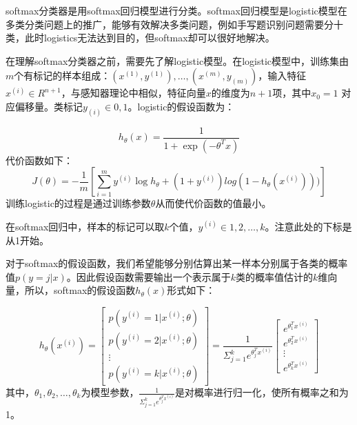 \documentclass[bachelor,zhspacing]{cqu}  %
\begin{document}
softmax分类器是用softmax回归模型进行分类。softmax回归模型是logistic模型在多类分类问题上的推广，能够有效解决多类问题，例如手写题识别问题需要分十类，此时logistics无法达到目的，但softmax却可以很好地解决。

在理解softmax分类器之前，需要先了解logistic模型。在logistic模型中，训练集由\(m\)个有标记的样本组成：\({(x^{(1)},y^{(1)}),\ldots,(x^{(m)},y_{(m)})}\)，输入特征\(x^{(i)} \in R^{n+1}\)，与感知器理论中相似，特征向量\(x\)的维度为\(n+1\)项，其中\(x_{0} = 1\)
对应偏移量。类标记\(y_{(i)}\in{0,1}\)。logistic的假设函数为：

\[h_{\theta}(x)=\frac{1}{1+\exp(-\theta^{T}x)}\] 代价函数如下：
\begin{equation}J(\theta) = - \frac{1}{m}[\sum_{i=1}^{m}y^{(i)}\log h_{\theta}+(1+y^{(i)})log(1-h_{\theta}(x^{(i)})))]\label{eq:logistic-cost}\end{equation}
训练logistic的过程是通过训练参数\(\theta\)从而使代价函数的值最小。

在softmax回归中，样本的标记可以取\(k\)个值，\(y^{(i)}\in {1,2,\ldots,k}\)。注意此处的下标是从1开始。

对于softmax的假设函数，我们希望能够分别估算出某一样本分别属于各类的概率值\(p(y=j|x)\)。因此假设函数需要输出一个表示属于\(k\)类的概率值估计的\(k\)维向量，所以，softmax的假设函数\(h_{\theta}(x)\)形式如下：

\[
    h_{\theta}(x^{(i)})=
        \left[
            \begin{array}{ccc}
                p(y^{(i)}=1|x^{(i)};\theta)\\
                p(y^{(i)}=2|x^{(i)};\theta)\\
                \vdots\\
                p(y^{(i)}=k|x^{(i)};\theta)
            \end{array}
        \right]=
        \frac{1}{\Sigma_{j = 1}^{k}e^{\theta_{j}^{T}x^{(i)}}}
        \left[
            \begin{array}{ccc}
                e^{\theta_{1}^{T}x^{(i)}}\\
                e^{\theta_{2}^{T}x^{(i)}}\\
                \vdots\\
                e^{\theta_{k}^{T}x^{(i)}}
            \end{array}
        \right]
\]
其中，\(\theta_{1},\theta_{2},\ldots,\theta_{k}\)为模型参数，\(\frac{1}{\Sigma_{j=1}^{k}e^{\theta_{j}^{T}x^{(i)}}}\)是对概率进行归一化，使所有概率之和为1。
\end{document}
